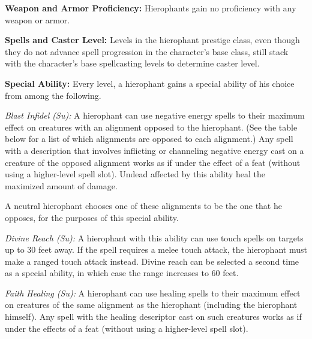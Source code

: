 {
\textbf{Weapon and Armor Proficiency:} Hierophants gain no proficiency with any weapon or armor.

\textbf{Spells and Caster Level:} Levels in the hierophant prestige class, even though they do not advance spell progression in the character’s base class, still stack with the character’s base spellcasting levels to determine caster level.

\textbf{Special Ability:} Every level, a hierophant gains a special ability of his choice from among the following.

\textit{Blast Infidel (Su):} A hierophant can use negative energy spells to their maximum effect on creatures with an alignment opposed to the hierophant. (See the table below for a list of which alignments are opposed to each alignment.) Any spell with a description that involves inflicting or channeling negative energy cast on a creature of the opposed alignment works as if under the effect of a  feat (without using a higher-level spell slot). Undead affected by this ability heal the maximized amount of damage.

A neutral hierophant chooses one of these alignments to be the one that he opposes, for the purposes of this special ability.


\textit{Divine Reach (Su):} A hierophant with this ability can use touch spells on targets up to 30 feet away. If the spell requires a melee touch attack, the hierophant must make a ranged touch attack instead. Divine reach can be selected a second time as a special ability, in which case the range increases to 60 feet.

\textit{Faith Healing (Su):} A hierophant can use healing spells to their maximum effect on creatures of the same alignment as the hierophant (including the hierophant himself). Any spell with the healing descriptor cast on such creatures works as if under the effects of a  feat (without using a higher-level spell slot).

}
